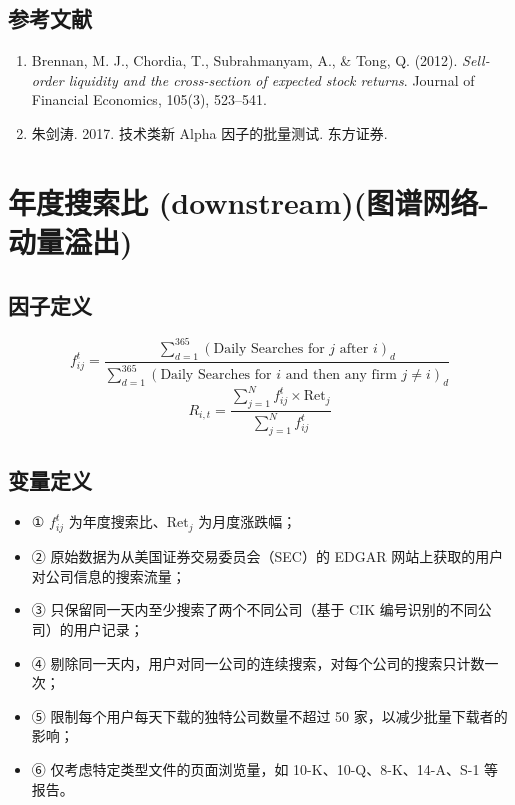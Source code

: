 \documentclass{article}
\begin{document}
\subsection{参考文献}
\begin{enumerate}
    \item Brennan, M. J., Chordia, T., Subrahmanyam, A., \& Tong, Q. (2012). \textit{Sell-order liquidity and the cross-section of expected stock returns}. Journal of Financial Economics, 105(3), 523–541.
    \item 朱剑涛. 2017. 技术类新 Alpha 因子的批量测试. 东方证券.
\end{enumerate}

\section{年度搜索比 (downstream)(图谱网络-动量溢出)}

\subsection{因子定义}
\begin{equation}
    f_{ij}^t = \frac{\sum_{d=1}^{365} (\text{Daily Searches for } j \text{ after } i)_d}{\sum_{d=1}^{365} (\text{Daily Searches for } i \text{ and then any firm } j \neq i)_d}
\end{equation}
\begin{equation}
    R_{i,t} = \frac{\sum_{j=1}^N f_{ij}^t \times \mathrm{Ret}_j}{\sum_{j=1}^N f_{ij}^t}
\end{equation}

\subsection{变量定义}
\begin{itemize}
    \item ① \( f_{ij}^t \) 为年度搜索比、\( \mathrm{Ret}_j \) 为月度涨跌幅；
    \item ② 原始数据为从美国证券交易委员会（SEC）的 EDGAR 网站上获取的用户对公司信息的搜索流量；
    \item ③ 只保留同一天内至少搜索了两个不同公司（基于 CIK 编号识别的不同公司）的用户记录；
    \item ④ 剔除同一天内，用户对同一公司的连续搜索，对每个公司的搜索只计数一次；
    \item ⑤ 限制每个用户每天下载的独特公司数量不超过 50 家，以减少批量下载者的影响；
    \item ⑥ 仅考虑特定类型文件的页面浏览量，如 10-K、10-Q、8-K、14-A、S-1 等报告。
\end{itemize}
\end{document}
